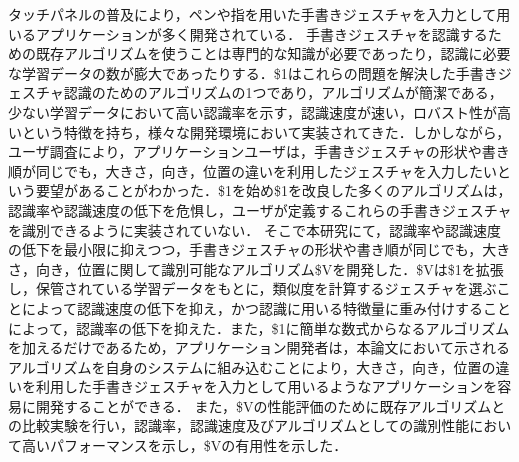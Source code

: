 タッチパネルの普及により，ペンや指を用いた手書きジェスチャを入力として用いるアプリケーションが多く開発されている．
手書きジェスチャを認識するための既存アルゴリズムを使うことは専門的な知識が必要であったり，認識に必要な学習データの数が膨大であったりする．\$1はこれらの問題を解決した手書きジェスチャ認識のためのアルゴリズムの1つであり，アルゴリズムが簡潔である，少ない学習データにおいて高い認識率を示す，認識速度が速い，ロバスト性が高いという特徴を持ち，様々な開発環境において実装されてきた．しかしながら，ユーザ調査により，アプリケーションユーザは，手書きジェスチャの形状や書き順が同じでも，大きさ，向き，位置の違いを利用したジェスチャを入力したいという要望があることがわかった．\$1を始め\$1を改良した多くのアルゴリズムは，認識率や認識速度の低下を危惧し，ユーザが定義するこれらの手書きジェスチャを識別できるように実装されていない．
そこで本研究にて，認識率や認識速度の低下を最小限に抑えつつ，手書きジェスチャの形状や書き順が同じでも，大きさ，向き，位置に関して識別可能なアルゴリズム\$Vを開発した．\$Vは\$1を拡張し，保管されている学習データをもとに，類似度を計算するジェスチャを選ぶことによって認識速度の低下を抑え，かつ認識に用いる特徴量に重み付けすることによって，認識率の低下を抑えた．また，\$1に簡単な数式からなるアルゴリズムを加えるだけであるため，アプリケーション開発者は，本論文において示されるアルゴリズムを自身のシステムに組み込むことにより，大きさ，向き，位置の違いを利用した手書きジェスチャを入力として用いるようなアプリケーションを容易に開発することができる．
また，\$Vの性能評価のために既存アルゴリズムとの比較実験を行い，認識率，認識速度及びアルゴリズムとしての識別性能において高いパフォーマンスを示し，\$Vの有用性を示した．
